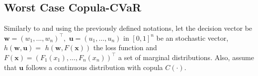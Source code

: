 \documentclass[a4paper,10pt]{article}
\begin{document}
\subsection{Worst Case Copula-CVaR}

Similarly to \citet*{kakouris14} and using the previously defined notations,
let the decision vector be $\mathbf{w=}\left( w_{1},...,w_{n}\right)^{\top},$ $\mathbf{u}=\left( u_{1},\ldots,u_{n}\right) $ in $[0,1]^{n}$ be an stochastic vector, $h\left( \mathbf{w,u}\right) =$ $h\left( \mathbf{w,}F\left( \mathbf{x}\right) \right) $ the loss function and $F\left( \mathbf{x} \right) =\left( F_{1}\left( x_{1}\right),\ldots,F_{n}\left( x_{n}\right)\right) ^{\top }$ a set of marginal distributions. Also, assume that $\mathbf{u}$ follows a continuous
distribution with copula $C\left( \cdot \right) $.
\end{document}
